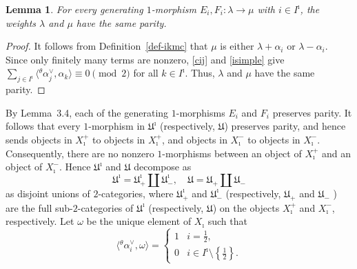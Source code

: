 \documentclass[a4,10pt]{amsart}
\numberwithin{equation}{section}
\newtheorem{Lemma}[Theorem]{Lemma}
\theoremstyle{definition}
\newcommand{\thal}{{}^{\theta}\!\alpha}
\begin{document}
\begin{Lemma}\label{evenodd}
For every generating $1$-morphism 
$E_i, F_i : \lambda \to \mu$ with $i \in I^\imath$, 
the weights $\lambda$ and $\mu$ have the same parity.
\end{Lemma}
\begin{proof}
   It follows from Definition~\ref{def-ikmc} that $\mu$ is either  $\lambda+\alpha_i$ or  $\lambda-\alpha_{i}$.  Since only finitely many terms are nonzero,    
    \eqref{cij} and \eqref{isimple} give  $\sum_{j\in I^\imath} \langle \thal^\vee_j,  \alpha_k\rangle \equiv 0\pmod 2$ for all $k\in I^\imath$. 
    Thus, $\lambda$ and $\mu$ have the same parity. \end{proof}

 By Lemma~3.4, each of the generating \(1\)-morphisms \(E_i\) and \(F_i\)
preserves parity. It follows that every \(1\)-morphism in
\(\mathfrak U^\imath\) (respectively, $\mathfrak U$) preserves parity, and hence sends objects in
\(X_\imath^+\) to objects in \(X_\imath^+\), and objects in
\(X_\imath^-\) to objects in \(X_\imath^-\). Consequently, there are no
nonzero \(1\)-morphisms between an object of \(X_\imath^+\) and an object
of \(X_\imath^-\). Hence \(\mathfrak U^\imath\) and $\mathfrak U$ decompose as
\begin{equation}\label{decomp1} 
\mathfrak U^\imath=\mathfrak U^\imath_+\amalg \mathfrak U^\imath_-, \quad  \mathfrak U=\mathfrak U_+\amalg \mathfrak U_-
\end{equation}
as  disjoint unions of \(2\)-categories, where
\(\mathfrak U^\imath_+\) and \(\mathfrak U^\imath_-\) (respectively, $\mathfrak U_+$ and $\mathfrak U_-$ ) are the full
sub-\(2\)-categories of \(\mathfrak U^\imath\) (respectively, $\mathfrak U$) on the objects
\(X_\imath^+\) and \(X_\imath^-\), respectively.  Let $\omega$ be the unique element of $X_\imath$
such that
\[
\langle \thal^\vee_i, \omega\rangle=
\begin{cases}
1 & i=\frac{1}{2},\\
0 & i\in I^\imath\setminus \left\{\frac{1}{2}\right\}.
\end{cases}
\]
\end{document}
